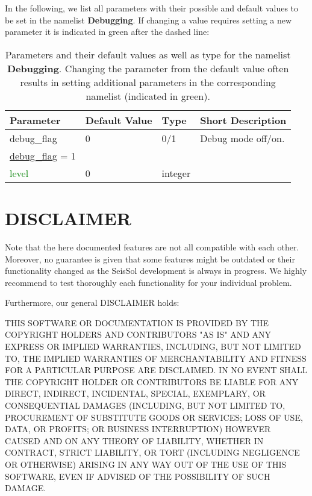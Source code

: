 \documentclass[12pt,twoside]{article}
\begin{document}
In the following, we list all parameters with their possible and default values to be set in the namelist \textbf{Debugging}.
If changing a value requires setting a new 
parameter it is indicated in green after the dashed line:\\

\begin{table}[H]
\caption{Parameters and their default values as well as type for the namelist \textbf{Debugging}.
         Changing the parameter from the default value often results in setting additional parameters
         in the corresponding namelist (indicated in green).}
\begin{center}
\begin{tabular}{|p{4cm}|p{2.7cm}|p{2cm}|p{4cm}|}
\hline
Parameter & Default Value & Type & Short Description \\
\hline
\hline
debug\_flag & 0 & 0/1 & Debug mode off/on. \\
\hdashline
\uline{debug\_flag} = 1 & & & \\
\textcolor{green}{level} & 0 & integer & \\
\hline
\end{tabular}
\end{center}
\label{debug-table}
\end{table}

\newpage

\section{DISCLAIMER}

Note that the here documented features are not all compatible with each other.
Moreover, no guarantee is given that some features might be outdated or their functionality changed 
as the SeisSol development is always in progress.
We highly recommend to test thoroughly each functionality for your individual problem.

\noindent Furthermore, our general DISCLAIMER holds:

\noindent THIS SOFTWARE OR DOCUMENTATION IS PROVIDED BY THE COPYRIGHT HOLDERS AND CONTRIBUTORS "AS IS"
AND ANY EXPRESS OR IMPLIED WARRANTIES, INCLUDING, BUT NOT LIMITED TO, THE
IMPLIED WARRANTIES OF MERCHANTABILITY AND FITNESS FOR A PARTICULAR PURPOSE
ARE DISCLAIMED. IN NO EVENT SHALL THE COPYRIGHT HOLDER OR CONTRIBUTORS BE
LIABLE FOR ANY DIRECT, INDIRECT, INCIDENTAL, SPECIAL, EXEMPLARY, OR
CONSEQUENTIAL DAMAGES (INCLUDING, BUT NOT LIMITED TO, PROCUREMENT OF
SUBSTITUTE GOODS OR SERVICES; LOSS OF USE, DATA, OR PROFITS; OR BUSINESS
INTERRUPTION) HOWEVER CAUSED AND ON ANY THEORY OF LIABILITY, WHETHER IN
CONTRACT, STRICT LIABILITY, OR TORT (INCLUDING NEGLIGENCE OR OTHERWISE)
ARISING IN ANY WAY OUT OF THE USE OF THIS SOFTWARE, EVEN IF ADVISED OF THE
POSSIBILITY OF SUCH DAMAGE.
\end{document}
